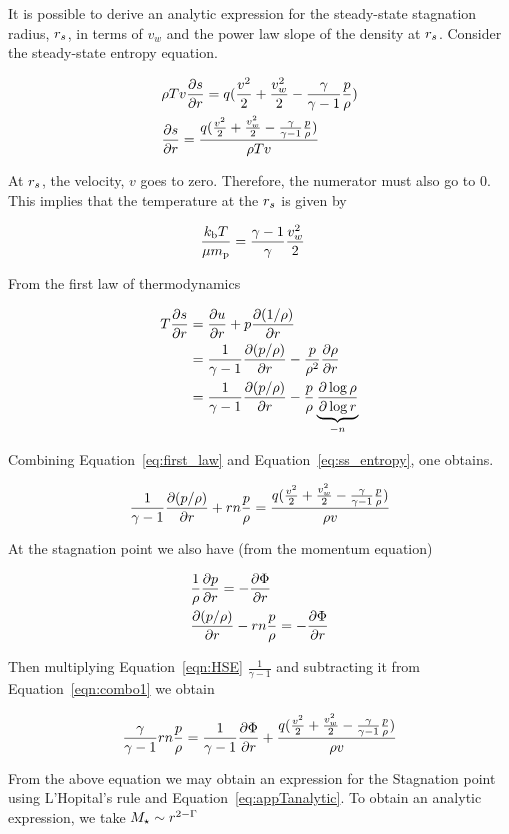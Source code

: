 It is possible to derive an analytic expression for the steady-state stagnation radius, $r_s$, in terms of $v_w$ and the power law slope of the density at $r_s$.  Consider the steady-state entropy equation.

\begin{align}
&\rho T v \frac{\partial s}{\partial r}=q (\frac{v^2}{2}+\frac{v_w^2}{2}-\frac{\gamma}{\gamma-1} \frac{p}{\rho})\\
&\frac{\partial s}{\partial r}=\frac{q (\frac{v^2}{2}+\frac{v_w^2}{2}-\frac{\gamma}{\gamma-1} \frac{p}{\rho})}{\rho T v} \label{eq:ss_entropy}
\end{align}

At $r_s$, the velocity, $v$ goes to zero.  Therefore, the numerator must also go to 0. This implies that the  temperature at the $r_s$ is given by

\begin{align}
 &\frac{k_{\rm b} T}{\mu m_{\rm p}}=\frac{\gamma-1}{\gamma} \frac{v_w^2}{2} 
\label{eq:appTanalytic}
\end{align}

From the first law of thermodynamics 

\begin{align}
T\frac{\partial s}{\partial r}&=\frac{\partial u}{\partial r}+p\frac{\partial (1/\rho)}{\partial r}\\
&=\frac{1}{\gamma-1}\frac{\partial (p/\rho)}{\partial r}-\frac{p}{\rho^2}\frac{\partial \rho}{\partial r}\\
&=\frac{1}{\gamma-1}\frac{\partial (p/\rho)}{\partial r}-\frac{p}{\rho} \underbrace{\frac{\partial \log{\rho}}{\partial \log{r}}}_{-n} \label{eq:first_law}
\end{align}

Combining Equation~\ref{eq:first_law} and Equation~\ref{eq:ss_entropy}, one obtains.

\begin{align}
\frac{1}{\gamma-1}\frac{\partial (p/\rho)}{\partial r}+r n \frac{p}{\rho}=\frac{q (\frac{v^2}{2}+\frac{v_w^2}{2}-\frac{\gamma}{\gamma-1} \frac{p}{\rho})}{\rho  v} \label{eqn:combo1}
\end{align}

At the stagnation point we also have (from the momentum equation)

\begin{align}
&\frac{1}{\rho}\frac{\partial p}{\partial r}=-\frac{\partial \Phi}{\partial r}\\
&\frac{\partial (p/\rho)}{\partial r}-r n \frac{p}{\rho}=-\frac{\partial \Phi}{\partial r} \label{eqn:HSE}
\end{align}

Then multiplying Equation~\ref{eqn:HSE}  $\frac{1}{\gamma-1}$ and subtracting it from Equation~\ref{eqn:combo1} we obtain

\begin{align}
\frac{\gamma}{\gamma-1} r n \frac{p}{\rho} = \frac{1}{\gamma-1} \frac{\partial \Phi}{\partial r} + \frac{q (\frac{v^2}{2}+\frac{v_w^2}{2}-\frac{\gamma}{\gamma-1} \frac{p}{\rho})}{\rho  v}
\end{align}

From the above equation we may obtain an expression for the Stagnation point using L'Hopital's rule and Equation~\ref{eq:appTanalytic}. To obtain an analytic expression, we take $M_{\star}\sim r^{2-\Gamma}$

